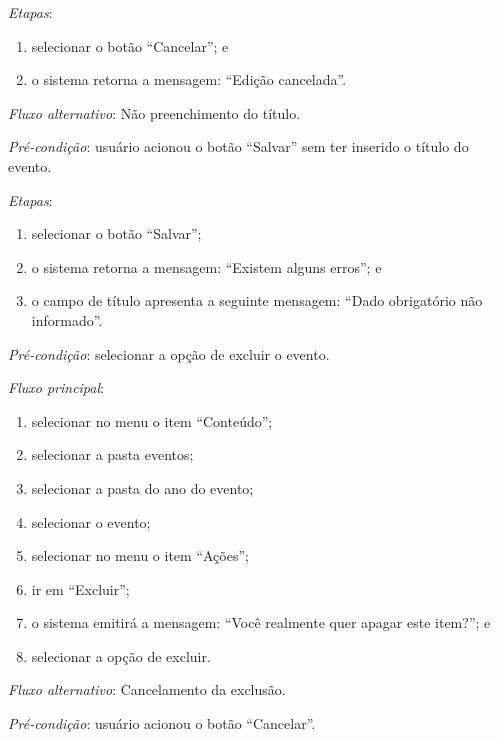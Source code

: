 \noindent \textit{Etapas}:

\begin{enumerate}
    \item selecionar o botão ``Cancelar''; e
    \item o sistema retorna a mensagem: ``Edição cancelada''.
\end{enumerate}

\noindent \textit{Fluxo alternativo}: Não preenchimento do título.

\noindent \textit{Pré-condição}: usuário acionou o botão ``Salvar'' sem ter inserido o título do evento.

\noindent \textit{Etapas}:

\begin{enumerate}
    \item selecionar o botão ``Salvar'';
    \item o sistema retorna a mensagem: ``Existem alguns erros''; e
    \item o campo de título apresenta a seguinte mensagem: ``Dado obrigatório não informado''.
\end{enumerate}



\vspace{0.7cm}

\noindent \textit{Pré-condição}: selecionar a opção de excluir o evento.

\noindent \textit{Fluxo principal}:

\begin{enumerate}
    \item selecionar no menu o item ``Conteúdo'';
    \item selecionar a pasta eventos;
    \item selecionar a pasta do ano do evento;
    \item selecionar o evento;
    \item selecionar no menu o item ``Ações'';
    \item ir em ``Excluir'';
    \item o sistema emitirá a mensagem: ``Você realmente quer apagar este item?''; e
    \item selecionar a opção de excluir.
\end{enumerate}

\noindent \textit{Fluxo alternativo}: Cancelamento da exclusão.

\noindent \textit{Pré-condição}: usuário acionou o botão ``Cancelar''.

